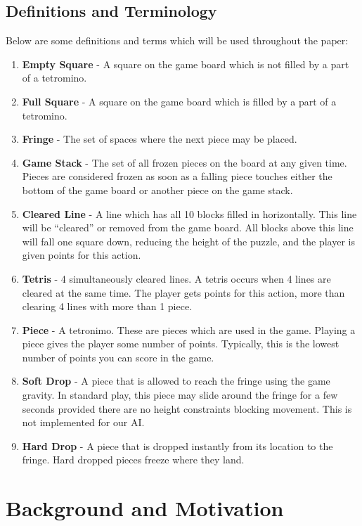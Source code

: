 \documentclass[11pt]{article}
\begin{document}
\subsection{Definitions and Terminology}
Below are some definitions and terms which will be used throughout the paper:
\begin{enumerate}
\item \textbf{Empty Square} - A square on the game board which is not filled by a part of a tetromino.
\item \textbf{Full Square} - A square on the game board which is filled by a part of a tetromino.
\item \textbf{Fringe} - The set of spaces where the next piece may be placed.
\item \textbf{Game Stack} - The set of all frozen pieces on the board at any given time. Pieces are considered frozen as soon as a falling piece touches either the bottom of the game board or another piece on the game stack.
\item \textbf{Cleared Line} - A line which has all 10 blocks filled in horizontally. This line will be ``cleared'' or removed from the game board. All blocks above this line will fall one square down, reducing the height of the puzzle, and the player is given points for this action.
\item \textbf{Tetris} - 4 simultaneously cleared lines. A tetris occurs when 4 lines are cleared at the same time. The player gets points for this action, more than clearing 4 lines with more than 1 piece.
\item \textbf{Piece} - A tetronimo. These are pieces which are used in the game. Playing a piece gives the player some number of points. Typically, this is the lowest number of points you can score in the game.
\item \textbf{Soft Drop} - A piece that is allowed to reach the fringe using the game gravity. In standard play, this piece may slide around the fringe for a few seconds provided there are no height constraints blocking movement. This is not implemented for our AI.
\item \textbf{Hard Drop} - A piece that is dropped instantly from its location to the fringe. Hard dropped pieces freeze where they land.
\end{enumerate}


\section{Background and Motivation}
\end{document}
